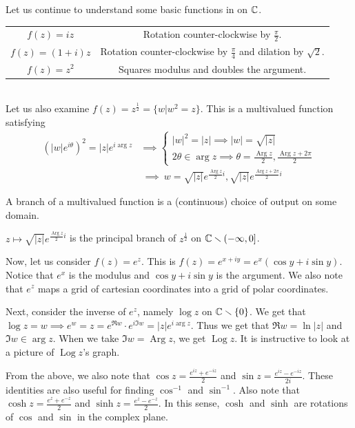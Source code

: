 \documentclass[11pt,leqno,oneside]{amsart}
\newcommand{\Arg}{\operatorname{Arg}}
\newcommand{\Log}{\operatorname{Log}}
\begin{document}
Let us continue to understand some basic functions in on ${\mathbb C}$. \\
\begin{tabular}{|c|c|}
    \hline
    $f(z) = iz$ & Rotation counter-clockwise by $\frac{\pi}{2}$. \\
    $f(z) = (1+i)z$ & Rotation counter-clockwise by $\frac{\pi}{4}$ and dilation by $\sqrt{2}$. \\
    $f(z) = z^2$ & Squares modulus and doubles the argument. \\
   \hline
\end{tabular} \\
Let us also examine $f(z) = z^{\frac{1}{2}} = \{w | w^2=z\}$. This is a multivalued function satisfying
\begin{align*}
    (|w|e^{i\theta})^2 = |z|e^{i \arg z} & \implies \begin{cases}
        |w|^2 = |z| \implies |w| = \sqrt{|z|} \\
        2\theta \in \arg z \implies \theta = \frac{\Arg z}{2}, \frac{\Arg z + 2\pi}{2}
    \end{cases} \\
    \ & \ \implies \ w = \sqrt{|z|}e^{\frac{\Arg z}{2}i}, \sqrt{|z|}e^{\frac{\Arg z + 2\pi}{2} i}
\end{align*}
\begin{defn}
    A branch of a multivalued function is a (continuous) choice of output on some domain.
\end{defn}
\begin{example}
    $z \mapsto \sqrt{|z|}e^{\frac{\Arg z}{2}i}$ is the principal branch of
    $z^{\frac{1}{2}}$ on ${\mathbb C} \smallsetminus (-\infty,0]$.
\end{example}

Now, let us consider $f(z) = e^z$. This is $f(z) = e^{x+iy} = e^x(\cos y +
i\sin y)$. Notice that $e^x$ is the modulus and $\cos y + i \sin y$ is the
argument. We also note that $e^z$ maps a grid of cartesian coordinates into a
grid of polar coordinates.

Next, consider the inverse of $e^z$, namely $\log z$ on ${\mathbb C} \smallsetminus
\{0\}$. We get that $\log z = w \implies e^w = z = e^{\Re w} \cdot e^{i \Im w}
= |z|e^{i \arg z}$. Thus we get that $\Re w = \ln|z|$ and $\Im w \in \arg z$.
When we take $\Im w = \Arg z$, we get $\Log z$. It is instructive to look at a
picture of $\Log z$'s graph.

From the above, we also note that $\cos z = \frac{e^{iz}+e^{-iz}}{2}$ and $\sin
z = \frac{e^{iz}-e^{-iz}}{2i}$. These identities are also useful for finding
$\cos^{-1}$ and $\sin^{-1}$. Also note that $\cosh z = \frac{e^z+e^{-z}}{2}$
and $\sinh z = \frac{e^z-e^{-z}}{2}$. In this sense, $\cosh$ and $\sinh$ are
rotations of $\cos$ and $\sin$ in the complex plane.
\end{document}
